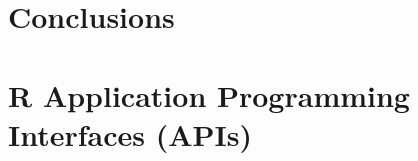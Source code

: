 \section{Conclusions}


\section{R Application Programming Interfaces (APIs)}




\begin{thebibliography}{00}

\end{thebibliography}

